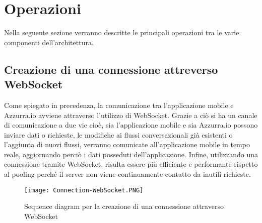 \section{Operazioni}
Nella seguente sezione verranno descritte le principali operazioni tra le varie componenti dell'architettura.
\subsection{Creazione di una connessione attreverso WebSocket}
Come spiegato in precedenza, la comunicazione tra l'applicazione mobile e Azzurra.io avviene attraverso l'utilizzo di \gls{WebSocket}\ap{[g]}. Grazie a ciò si ha un canale di comunicazione a due vie cioè, sia l'applicazione mobile e sia Azzurra.io possono inviare dati o richieste, le modifiche ai flussi conversazionali già esistenti o l'aggiunta di nuovi flussi, verranno comunicate all'applicazione mobile in tempo reale, aggiornando perciò i dati posseduti dell'applicazione. Infine, utilizzando una connessione tramite \gls{WebSocket}\ap{[g]}, risulta essere più efficiente e performante rispetto al pooling perché il server non viene continuamente contatto da inutili richieste.
\begin{figure}[h]
	\begin{center}
		\texttt{[image: Connection-WebSocket.PNG]}
		\caption{Sequence diagram per la creazione di una connessione attraverso WebSocket}\label{fig:websocket}
	\end{center}
\end{figure}

